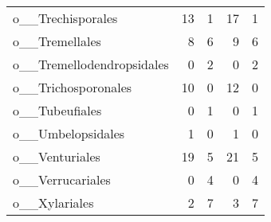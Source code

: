 \begin{tabular}{lrrrr}
o\_\_Trechisporales & 13 & 1 & 17 & 1 \\
o\_\_Tremellales & 8 & 6 & 9 & 6 \\
o\_\_Tremellodendropsidales & 0 & 2 & 0 & 2 \\
o\_\_Trichosporonales & 10 & 0 & 12 & 0 \\
o\_\_Tubeufiales & 0 & 1 & 0 & 1 \\
o\_\_Umbelopsidales & 1 & 0 & 1 & 0 \\
o\_\_Venturiales & 19 & 5 & 21 & 5 \\
o\_\_Verrucariales & 0 & 4 & 0 & 4 \\
o\_\_Xylariales & 2 & 7 & 3 & 7 \\
\end{tabular}
